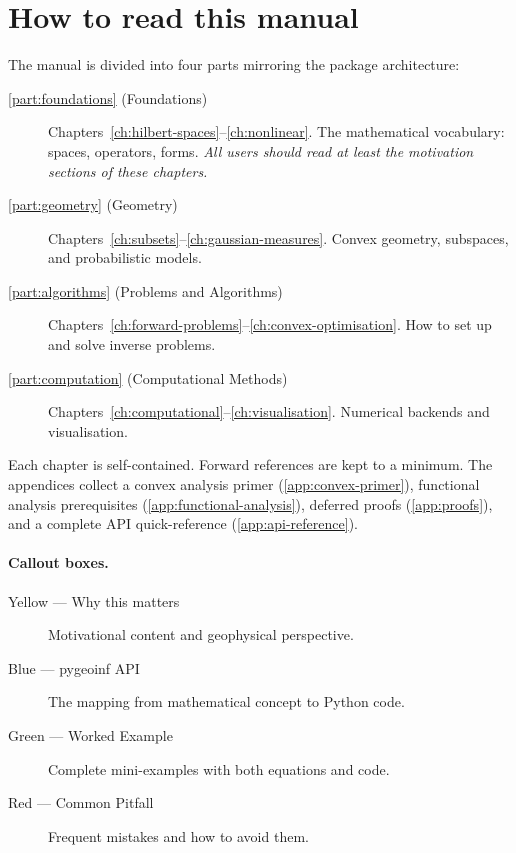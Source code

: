 \documentclass[11pt,twoside,openright]{book}
\theoremstyle{plain}
\theoremstyle{definition}
\theoremstyle{remark}
\begin{document}
\section{How to read this manual}
\label{sec:how-to-read}

The manual is divided into four parts mirroring the package architecture:

\begin{description}
  \item[\cref{part:foundations} (Foundations)]
    Chapters~\ref{ch:hilbert-spaces}--\ref{ch:nonlinear}.
    The mathematical vocabulary: spaces, operators, forms.
    \emph{All users should read at least the motivation sections of these
    chapters.}
  \item[\cref{part:geometry} (Geometry)]
    Chapters~\ref{ch:subsets}--\ref{ch:gaussian-measures}.
    Convex geometry, subspaces, and probabilistic models.
  \item[\cref{part:algorithms} (Problems and Algorithms)]
    Chapters~\ref{ch:forward-problems}--\ref{ch:convex-optimisation}.
    How to set up and solve inverse problems.
  \item[\cref{part:computation} (Computational Methods)]
    Chapters~\ref{ch:computational}--\ref{ch:visualisation}.
    Numerical backends and visualisation.
\end{description}

Each chapter is self-contained. Forward references are kept to a minimum.
The appendices collect a convex analysis primer
(\cref{app:convex-primer}), functional analysis prerequisites
(\cref{app:functional-analysis}), deferred proofs
(\cref{app:proofs}), and a complete API quick-reference
(\cref{app:api-reference}).

\paragraph{Callout boxes.}
\begin{description}
  \item[\textcolor{yellow!60!gray}{Yellow} --- Why this matters]
    Motivational content and geophysical perspective.
  \item[\textcolor{blue!60}{Blue} --- pygeoinf API]
    The mapping from mathematical concept to Python code.
  \item[\textcolor{green!60!gray}{Green} --- Worked Example]
    Complete mini-examples with both equations and code.
  \item[\textcolor{red!60}{Red} --- Common Pitfall]
    Frequent mistakes and how to avoid them.
\end{description}
\end{document}
